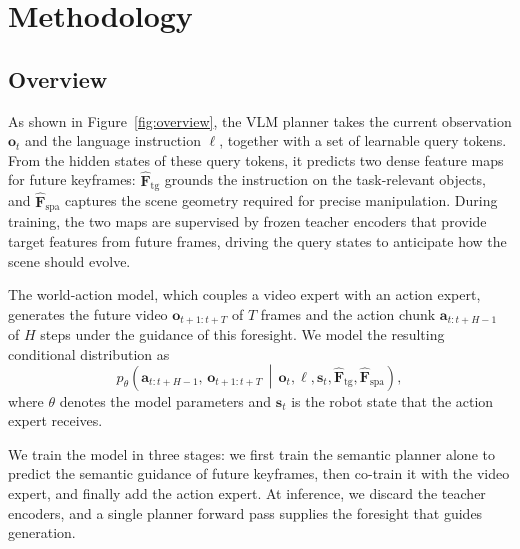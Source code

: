 \section{Methodology}
\label{sec:method}

\subsection{Overview}
\label{sec:method_overview}
As shown in Figure~\ref{fig:overview}, the VLM planner takes the current observation $\mathbf{o}_t$ and the language
instruction $\ell$, together with a set of learnable query tokens.
From the hidden states of these query tokens, it predicts two dense feature maps for future keyframes: $\hat{\mathbf{F}}_{\mathrm{tg}}$ grounds the instruction on the task-relevant objects, and $\hat{\mathbf{F}}_{\mathrm{spa}}$ captures the
scene geometry required for precise manipulation.
During training, the two maps are supervised by frozen teacher encoders that
provide target features from future frames, driving the query states to
anticipate how the scene should evolve.

The world-action model, which couples a video expert with an action expert, generates the future video $\mathbf{o}_{t+1:t+T}$ of $T$ frames and the action chunk $\mathbf{a}_{t:t+H-1}$ of $H$ steps under the guidance of this foresight. We model the resulting conditional distribution as
\begin{equation}
    p_{\theta}\!\left(
        \mathbf{a}_{t:t+H-1},\,
        \mathbf{o}_{t+1:t+T}
        \,\middle|\,
        \mathbf{o}_t,\ell,\mathbf{s}_t,
        \hat{\mathbf{F}}_{\mathrm{tg}},
        \hat{\mathbf{F}}_{\mathrm{spa}}
    \right),
    \label{eq:wam_overview}
\end{equation}
where $\theta$ denotes the model parameters and $\mathbf{s}_t$ is the robot state that the action expert receives.

We train the model in three stages: we first train the semantic planner alone to
predict the semantic guidance of future keyframes, then co-train it with the
video expert, and finally add the action expert.
At inference, we discard the teacher encoders, and a single planner forward pass supplies
the foresight that guides generation.

